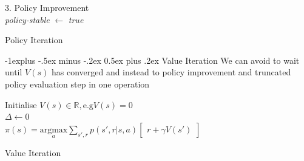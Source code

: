\documentclass[10pt,landscape]{article}
\makeatletter
\renewcommand{\subsection}{\@startsection{subsection}{2}{0mm}%
                                {-1explus -.5ex minus -.2ex}%
                                {0.5ex plus .2ex}%
                                {\normalfont\normalsize\bfseries}}
\makeatother
\begin{document}
\begin{multicols}{3}
\begin{algorithm}[H]
{ }
 3. Policy Improvement \\
 \emph{policy-stable} $ \leftarrow $ \emph{true} \\
\caption{Policy Iteration}
\end{algorithm}

\subsection{Value Iteration}
We can avoid to wait until $V(s)$ has converged and instead to policy improvement and truncated policy evaluation step in one operation 
\begin{algorithm}[H]
 Initialise $V(s) \in \mathbb{R}, \text{e.g} V(s) = 0$ \\
 $\Delta \leftarrow 0$ \\
  $\pi(s) = \text{argmax}\limits_a \sum\limits_{s', r} p(s',r | s, a) \begin{bmatrix}
  		r + \gamma V(s')
  	\end{bmatrix}$ 
\caption{Value Iteration}
\end{algorithm} 

\end{multicols}
\end{document}
